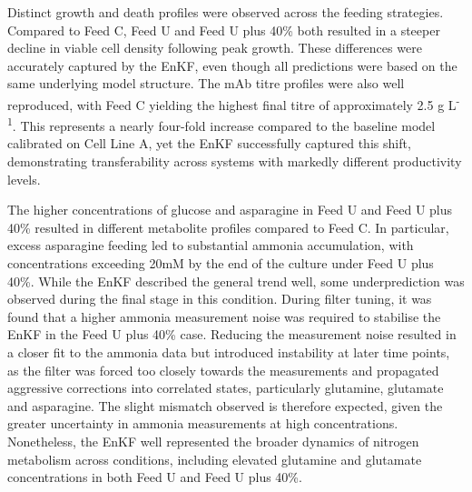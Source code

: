 Distinct growth and death profiles were observed across the feeding strategies. Compared to Feed C, Feed U and Feed U plus 40\% both resulted in a steeper decline in viable cell density following peak growth. These differences were accurately captured by the EnKF, even though all predictions were based on the same underlying model structure. The mAb titre profiles were also well reproduced, with Feed C yielding the highest final titre of approximately 2.5 g L\textsuperscript{-1}. This represents a nearly four-fold increase compared to the baseline model calibrated on Cell Line A, yet the EnKF successfully captured this shift, demonstrating transferability across systems with markedly different productivity levels.

The higher concentrations of glucose and asparagine in Feed U and Feed U plus 40\% resulted in different metabolite profiles compared to Feed C. In particular, excess asparagine feeding led to substantial ammonia accumulation, with concentrations exceeding 20mM by the end of the culture under Feed U plus 40\%. While the EnKF described the general trend well, some underprediction was observed during the final stage in this condition. During filter tuning, it was found that a higher ammonia measurement noise was required to stabilise the EnKF in the Feed U plus 40\% case. Reducing the measurement noise resulted in a closer fit to the ammonia data but introduced instability at later time points, as the filter was forced too closely towards the measurements and propagated aggressive corrections into correlated states, particularly glutamine, glutamate and asparagine. The slight mismatch observed is therefore expected, given the greater uncertainty in ammonia measurements at high concentrations. Nonetheless, the EnKF well represented the broader dynamics of nitrogen metabolism across conditions, including elevated glutamine and glutamate concentrations in both Feed U and Feed U plus 40\%.

